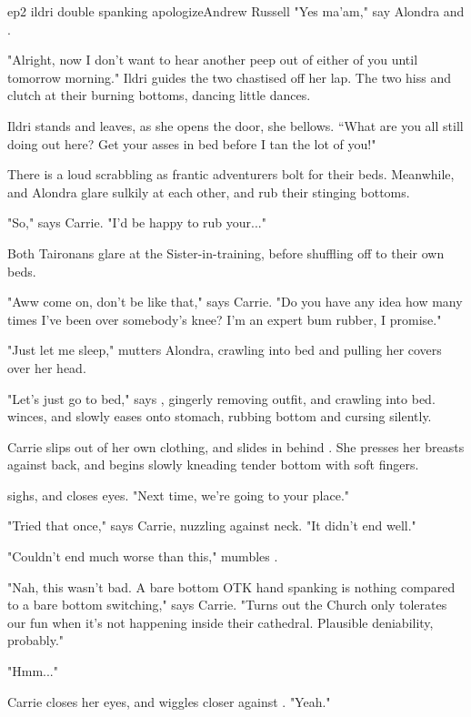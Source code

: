 \documentclass{book}
\begin{document}
\begin{childnode}{ep2 ildri double spanking apologize}{Andrew Russell}
    "Yes ma'am," say Alondra and \name{}.

    "Alright, now I don't want to hear another peep out of either of you until tomorrow morning." Ildri guides the two chastised  off her lap. The two hiss and clutch at
    their burning bottoms, dancing little dances.

    Ildri stands and leaves, as she opens the door, she bellows. ``What are you all still doing out here? Get your asses in bed before I tan the lot of you!" 

    There is a loud scrabbling as frantic adventurers bolt for their beds.
    Meanwhile, \name{} and Alondra glare sulkily at each other, and rub their stinging bottoms.

    "So," says Carrie. "I'd be happy to rub your..."

    Both Taironans glare at the Sister-in-training, before shuffling off to their own beds.

    "Aww come on, don't be like that," says Carrie. "Do you have any idea how many times I've been over somebody's knee? I'm an expert bum rubber, I promise."

    "Just let me sleep," mutters Alondra, crawling into bed and pulling her covers over her head.

    "Let's just go to bed," says \name{}, gingerly removing \hisher{} outfit, and crawling into bed. \HeShe{} winces, and slowly eases \himselfherself{} onto \hisher{} stomach, rubbing \hisher{} bottom and cursing 
    silently.

    Carrie slips out of her own clothing, and slides in behind \name{}. She presses her breasts against \names{} back, and begins slowly kneading \names{} tender bottom with soft fingers. 

    \name{} sighs, and closes \hisher{} eyes. "Next time, we're going to your place."

    "Tried that once," says Carrie, nuzzling against \names{} neck. "It didn't end well."

    "Couldn't end much worse than this," mumbles \name{}.

    "Nah, this wasn't bad. A bare bottom OTK hand spanking is nothing compared to a bare bottom switching," says Carrie. "Turns out the Church only tolerates our fun when it's not happening inside their cathedral. Plausible 
    deniability, probably."

    "Hmm..."

    Carrie closes her eyes, and wiggles closer against \name{}. "Yeah."


\end{childnode}
\end{document}
